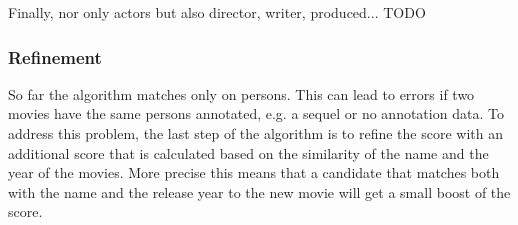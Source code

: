 Finally, nor only actors but also director, writer, produced... TODO

\subsubsection{Refinement}
So far the algorithm matches only on persons.
This can lead to errors if two movies have the same persons annotated, e.g. a sequel or no annotation data. To address this problem, the last step of the algorithm is to refine the score with an additional score that is calculated based on the similarity of the name and the year of the movies. More precise this means that a candidate that matches both with the name and the release year to the new movie will get a small boost of the score.


